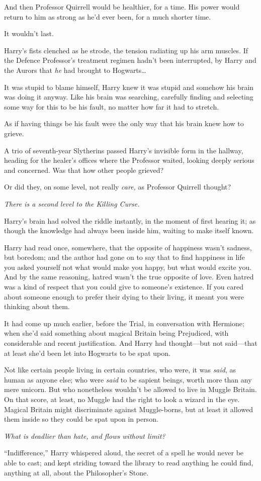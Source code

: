 And then Professor Quirrell would be healthier, for a time. His power would return to him as strong as he’d ever been, for a much shorter time.

It wouldn’t last.

Harry’s fists clenched as he strode, the tension radiating up his arm muscles. If the Defence Professor’s treatment regimen hadn’t been interrupted, by Harry and the Aurors that \emph{he} had brought to Hogwarts…

It was stupid to blame himself, Harry knew it was stupid and somehow his brain was doing it anyway. Like his brain was searching, carefully finding and selecting some way for this to be his fault, no matter how far it had to stretch.

As if having things be his fault were the only way that his brain knew how to grieve.

A trio of seventh-year Slytherins passed Harry’s invisible form in the hallway, heading for the healer’s offices where the Professor waited, looking deeply serious and concerned. Was that how other people grieved?

Or did they, on some level, not really \emph{care,} as Professor Quirrell thought?

\emph{There is a second level to the Killing Curse.}

Harry’s brain had solved the riddle instantly, in the moment of first hearing it; as though the knowledge had always been inside him, waiting to make itself known.

Harry had read once, somewhere, that the opposite of happiness wasn’t sadness, but boredom; and the author had gone on to say that to find happiness in life you asked yourself not what would make you happy, but what would excite you. And by the same reasoning, hatred wasn’t the true opposite of love. Even hatred was a kind of respect that you could give to someone’s existence. If you cared about someone enough to prefer their dying to their living, it meant you were thinking about them.

It had come up much earlier, before the Trial, in conversation with Hermione; when she’d said something about magical Britain being Prejudiced, with considerable and recent justification. And Harry had thought—but not said—that at least she’d been let into Hogwarts to be spat upon.

Not like certain people living in certain countries, who were, it was \emph{said}, as human as anyone else; who were \emph{said} to be sapient beings, worth more than any mere unicorn. But who nonetheless wouldn’t be allowed to live in Muggle Britain. On that score, at least, no Muggle had the right to look a wizard in the eye. Magical Britain might discriminate against Muggle-borns, but at least it allowed them inside so they could be spat upon in person.

\emph{What is deadlier than hate, and flows without limit?}

“Indifference,” Harry whispered aloud, the secret of a spell he would never be able to cast; and kept striding toward the library to read anything he could find, anything at all, about the Philosopher’s Stone.

